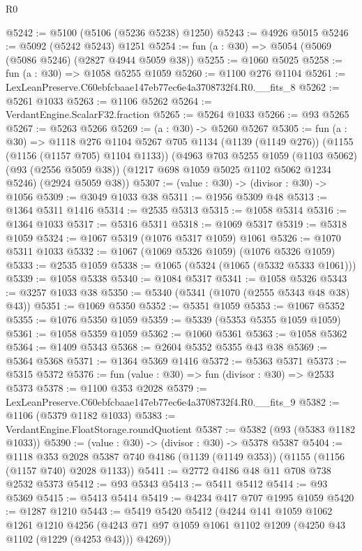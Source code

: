 \begin{lexlean}{R0}
\begin{coremodule}
@5242 := @5100 (@5106 (@5236 @5238) @1250)
@5243 := @4926 @5015
@5246 := @5092 (@5242 @5243) @1251
@5254 := fun (a : @30) => @5054 (@5069 (@5086 @5246) (@2827 @4944 @5059 @38))
@5255 := @1060 @5025
@5258 := fun (a : @30) => @1058 @5255 @1059
@5260 := @1100 @276 @1104
@5261 := LexLeanPreserve.C60ebfcbaae147eb77ec6e4a3708732f4.R0.__fits_8
@5262 := @5261 @1033
@5263 := @1106 @5262
@5264 := VerdantEngine.ScalarF32.fraction
@5265 := @5264 @1033
@5266 := @93 @5265
@5267 := @5263 @5266
@5269 := (a : @30) -> @5260 @5267
@5305 := fun (a : @30) =>
  @1118
    @276
    @1104
    @5267
    @705
    @1134
    (@1139 (@1149 @276))
    (@1155 (@1156 (@1157 @705) @1104 @1133))
    (@4963
      @703
      @5255
      @1059
      (@1103 @5062)
      (@93 (@2556 @5059 @38))
      (@1217 @698 @1059 @5025 @1102 @5062 @1234 @5246)
      (@2924 @5059 @38))
@5307 := (value : @30) -> (divisor : @30) -> @1056
@5309 := @3049 @1033 @38
@5311 := @1956 @5309 @48
@5313 := @1364 @5311 @1416
@5314 := @2535 @5313
@5315 := @1058 @5314
@5316 := @1364 @1033
@5317 := @5316 @5311
@5318 := @1069 @5317
@5319 := @5318 @1059
@5324 := @1067 @5319 (@1076 @5317 @1059) @1061
@5326 := @1070 @5311 @1033
@5332 := @1067 (@1069 @5326 @1059) (@1076 @5326 @1059)
@5333 := @2535 @1059
@5338 := @1065 (@5324 (@1065 (@5332 @5333 @1061)))
@5339 := @1058 @5338
@5340 := @1084 @5317
@5341 := @1058 @5326
@5343 := @3257 @1033 @38
@5350 := @5340 (@5341 (@1070 (@2555 @5343 @48 @38) @43))
@5351 := @1069 @5350
@5352 := @5351 @1059
@5353 := @1067 @5352
@5355 := @1076 @5350 @1059
@5359 := @5339 (@5353 @5355 @1059 @1059)
@5361 := @1058 @5359 @1059
@5362 := @1060 @5361
@5363 := @1058 @5362
@5364 := @1409 @5343
@5368 := @2604 @5352 @5355 @43 @38
@5369 := @5364 @5368
@5371 := @1364 @5369 @1416
@5372 := @5363 @5371
@5373 := @5315 @5372
@5376 := fun (value : @30) => fun (divisor : @30) => @2533 @5373
@5378 := @1100 @353 @2028
@5379 := LexLeanPreserve.C60ebfcbaae147eb77ec6e4a3708732f4.R0.__fits_9
@5382 := @1106 (@5379 @1182 @1033)
@5383 := VerdantEngine.FloatStorage.roundQuotient
@5387 := @5382 (@93 (@5383 @1182 @1033))
@5390 := (value : @30) -> (divisor : @30) -> @5378 @5387
@5404 := @1118
    @353
    @2028
    @5387
    @740
    @4186
    (@1139 (@1149 @353))
    (@1155 (@1156 (@1157 @740) @2028 @1133))
@5411 := @2772 @4186 @48 @11 @708 @738 @2532 @5373
@5412 := @93 @5343
@5413 := @5411 @5412
@5414 := @93 @5369
@5415 := @5413 @5414
@5419 := @4234 @417 @707 @1995 @1059
@5420 := @1287 @1210
@5443 := @5419
    @5420
    @5412
    (@4244
      @141
      @1059
      @1062
      @1261
      @1210
      @4256
      (@4243 @71 @97 @1059 @1061 @1102 @1209 (@4250 @43 @1102 (@1229 (@4253 @43))) @4269))

\end{coremodule}
\end{lexlean}
